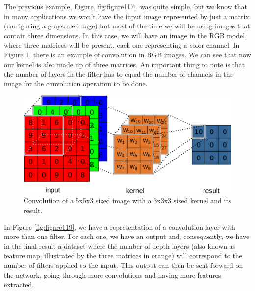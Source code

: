 The previous example, Figure \ref{fig:figure117}, was quite simple, but we know that in many applications we won't have the input image represented by just a matrix (configuring a grayscale image) but most of the time we will be using images that contain three dimensions. In this case, we will have an image in the RGB model, where three matrices will be present, each one representing a color channel. In Figure \ref{fig:figure118}, there is an example of convolution in RGB images. We can see that now our kernel is also made up of three matrices. An important thing to note is that the number of layers in the filter has to equal the number of channels in the image for the convolution operation to be done.

\begin{figure}
    \centering
    \includegraphics[scale=0.35]{"Part 3 - Learning Systems/Supervised Learning/Deep Learning/images/figure118.png"}
    \caption{Convolution of a 5x5x3 sized image with a 3x3x3 sized kernel and its result.}
    \label{fig:figure118}
\end{figure}

In Figure \ref{fig:figure119}, we have a representation of a convolution layer with more than one filter. For each one, we have an output and, consequently, we have in the final result a dataset where the number of depth layers (also known as feature map, illustrated by the three matrices in orange) will correspond to the number of filters applied to the input. This output can then be sent forward on the network, going through more convolutions and having more features extracted.

